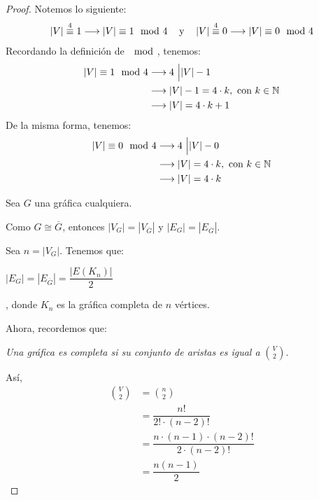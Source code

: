 \documentclass{article}
\begin{document}
\begin{enumerate}
\begin{enumerate}
      \begin{proof}
        Notemos lo siguiente:
        $$|V| \stackrel{4}{\equiv} 1 \longrightarrow |V| \equiv 1 \mod{4} \text{\hspace{0.3cm} y \hspace{0.3cm}} |V| \stackrel{4}{\equiv} 0 \longrightarrow |V| \equiv 0 \mod{4}$$
        Recordando la definición de $\mod$, tenemos:
        \begin{align*}
          |V| \equiv 1 \mod{4}
          & \longrightarrow 4 \text{ \Big \vert } |V| - 1 \\
          & \longrightarrow |V| - 1 = 4 \cdot k, \text{ con $k \in \mathbb{N}$} \\
          & \longrightarrow |V| = 4 \cdot k + 1
        \end{align*}
        De la misma forma, tenemos:
        \begin{align*}
          |V| \equiv 0 \mod{4}
          & \longrightarrow 4 \text{ \Big \vert } |V| - 0 \\
          & \longrightarrow |V| = 4 \cdot k, \text{ con $k \in \mathbb{N}$} \\
          & \longrightarrow |V| = 4 \cdot k
        \end{align*}

        Sea $G$ una gráfica cualquiera.

        Como $G \cong \overline{G}$, entonces $|V_{G}| = |V_{\overline{G}}|$ y $|E_{G}| = |E_{\overline{G}}|$.

        Sea $n = |V_{G}|$. Tenemos que:
        \begin{center}
          $|E_{G}| = |E_{\overline{G}}| = \dfrac{|E(K_{n})|}{2}$

          , donde $K_{n}$ es la gráfica completa de $n$ vértices.
        \end{center}

        Ahora, recordemos que:
        \begin{center}
            \textit{Una gráfica es completa si su conjunto de aristas es igual a} $\displaystyle \binom{V}{2}$.
        \end{center}

        Así,
        \begin{align*}
          \binom{V}{2}
          & = \binom{n}{2} \\
          & = \dfrac{n!}{2! \cdot (n -2)!} \\
          & = \dfrac{n \cdot (n -1) \cdot (n - 2)!}{2 \cdot (n - 2)!} \\
          & = \dfrac{n(n - 1)}{2}
        \end{align*}


\end{proof}
\end{enumerate}
\end{enumerate}
\end{document}
